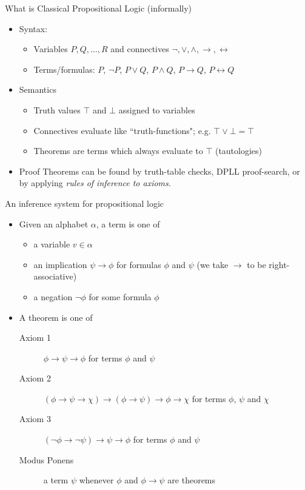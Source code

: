 \documentclass[presentation]{beamer}
\begin{document}
\begin{frame}[label={sec:orgheadline3}]{What is Classical Propositional Logic (informally)}
\begin{itemize}
\item Syntax:
\begin{itemize}
\item Variables \(P, Q, \ldots, R\) and connectives \(\neg, \vee, \wedge, \rightarrow, \leftrightarrow\)
\item Terms/formulas: \(P\), \(\neg P\), \(P \vee Q\), \(P \wedge Q\), \(P \rightarrow Q\), 
\(P \leftrightarrow Q\)
\end{itemize}

\item Semantics
\begin{itemize}
\item Truth values \(\top\) and \(\bot\) assigned to variables
\item Connectives evaluate like ``truth-functions"; e.g. \(\top \vee \bot = \top\)
\item Theorems are terms which always evaluate to \(\top\) (tautologies)
\end{itemize}

\item Proof
Theorems can be found by truth-table checks, DPLL proof-search, or by applying
\emph{rules of inference to axioms}.
\end{itemize}
\end{frame}

\begin{frame}[label={sec:orgheadline4}]{An inference system for propositional logic}
\begin{itemize}
\item Given an alphabet \(\alpha\), a term is one of
\begin{itemize}
\item a variable \(v \in \alpha\)
\item an implication \(\psi \rightarrow \phi\) for formulas \(\phi\) and \(\psi\) (we take
\(\rightarrow\) to be right-associative)
\item a negation \(\neg\phi\) for some formula \(\phi\)
\end{itemize}

\item A theorem is one of
\begin{description}
\item[{Axiom 1}] \(\phi \rightarrow \psi \rightarrow \phi\) for terms \(\phi\) and \(\psi\)
\item[{Axiom 2}] \((\phi \rightarrow \psi \rightarrow \chi) \rightarrow (\phi
       \rightarrow \psi) \rightarrow \phi \rightarrow \chi\)
       for terms \(\phi\), \(\psi\) and \(\chi\)
\item[{Axiom 3}] \((\neg \phi \rightarrow \neg \psi) \rightarrow \psi \rightarrow \phi\)
       for terms \(\phi\) and \(\psi\)
\item[{Modus Ponens}] a term \(\psi\) whenever \(\phi\) and \(\phi \rightarrow \psi\) are
theorems
\end{description}
\end{itemize}
\end{frame}
\end{document}
